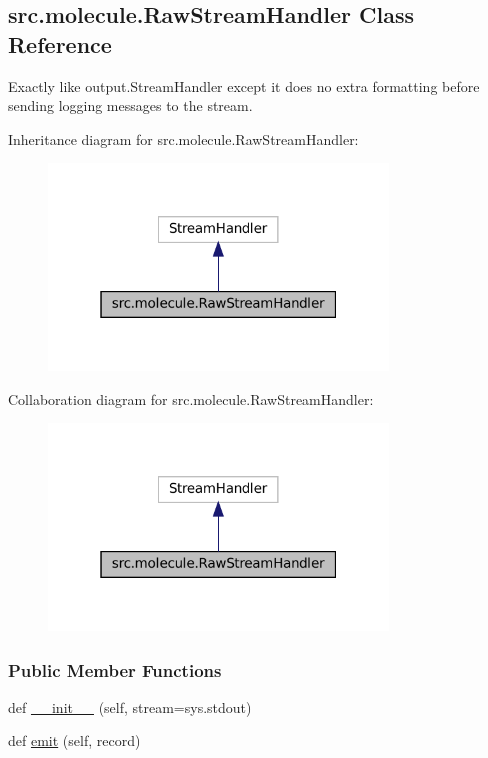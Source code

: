 \hypertarget{classsrc_1_1molecule_1_1RawStreamHandler}{}\subsection{src.\+molecule.\+Raw\+Stream\+Handler Class Reference}
\label{classsrc_1_1molecule_1_1RawStreamHandler}


Exactly like output.\+Stream\+Handler except it does no extra formatting before sending logging messages to the stream.  




Inheritance diagram for src.\+molecule.\+Raw\+Stream\+Handler\+:
\nopagebreak
\begin{figure}[H]
\begin{center}
\leavevmode
\includegraphics[width=256pt]{classsrc_1_1molecule_1_1RawStreamHandler__inherit__graph}
\end{center}
\end{figure}


Collaboration diagram for src.\+molecule.\+Raw\+Stream\+Handler\+:
\nopagebreak
\begin{figure}[H]
\begin{center}
\leavevmode
\includegraphics[width=256pt]{classsrc_1_1molecule_1_1RawStreamHandler__coll__graph}
\end{center}
\end{figure}
\subsubsection*{Public Member Functions}
\begin{DoxyCompactItemize}
\item 
def \hyperlink{classsrc_1_1molecule_1_1RawStreamHandler_a5f47165f46eee9c11ddea1826faaa55c}{\+\_\+\+\_\+init\+\_\+\+\_\+} (self, stream=sys.\+stdout)
\item 
def \hyperlink{classsrc_1_1molecule_1_1RawStreamHandler_a7994595f5f16fe262528c67505ad4a0e}{emit} (self, record)
\end{DoxyCompactItemize}


